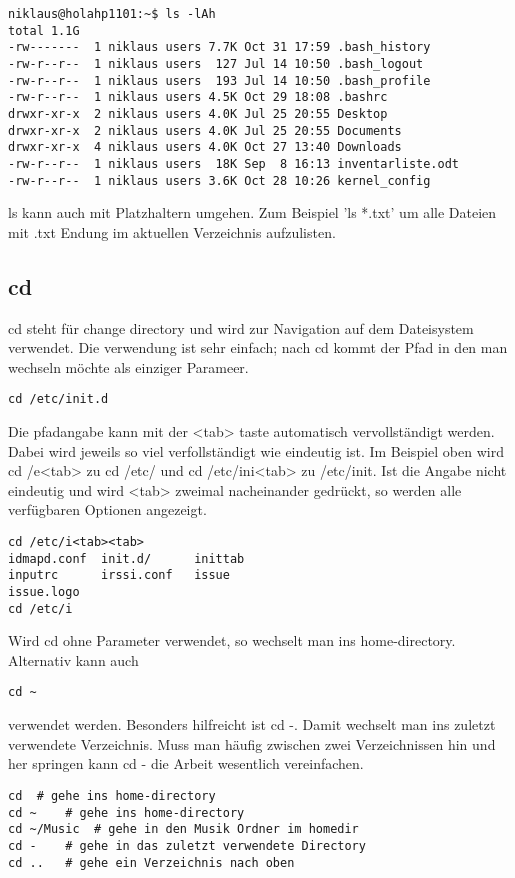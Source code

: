 \begin{lstlisting}[frame=single]
niklaus@holahp1101:~$ ls -lAh
total 1.1G
-rw-------  1 niklaus users 7.7K Oct 31 17:59 .bash_history
-rw-r--r--  1 niklaus users  127 Jul 14 10:50 .bash_logout
-rw-r--r--  1 niklaus users  193 Jul 14 10:50 .bash_profile
-rw-r--r--  1 niklaus users 4.5K Oct 29 18:08 .bashrc
drwxr-xr-x  2 niklaus users 4.0K Jul 25 20:55 Desktop
drwxr-xr-x  2 niklaus users 4.0K Jul 25 20:55 Documents
drwxr-xr-x  4 niklaus users 4.0K Oct 27 13:40 Downloads
-rw-r--r--  1 niklaus users  18K Sep  8 16:13 inventarliste.odt
-rw-r--r--  1 niklaus users 3.6K Oct 28 10:26 kernel_config
\end{lstlisting}
ls kann auch mit Platzhaltern umgehen. Zum Beispiel 'ls *.txt' um alle Dateien mit .txt Endung im aktuellen Verzeichnis aufzulisten.
\subsection{cd}
cd steht f\"ur change directory und wird zur Navigation auf dem Dateisystem verwendet. Die verwendung ist sehr einfach; nach cd kommt der Pfad in den man wechseln m\"ochte als einziger Parameer.
\begin{lstlisting}[frame=single]
cd /etc/init.d
\end{lstlisting}
Die pfadangabe kann mit der <tab> taste automatisch vervollst\"andigt werden. Dabei wird jeweils so viel verfollst\"andigt wie eindeutig ist. Im Beispiel oben wird cd /e<tab> zu cd /etc/ und cd /etc/ini<tab> zu /etc/init. Ist die Angabe nicht eindeutig und wird <tab> zweimal nacheinander gedr\"uckt, so werden alle verf\"ugbaren Optionen angezeigt.
\begin{lstlisting}[frame=single]
cd /etc/i<tab><tab>
idmapd.conf  init.d/      inittab
inputrc      irssi.conf   issue
issue.logo
cd /etc/i
\end{lstlisting}
Wird cd ohne Parameter verwendet, so wechselt man ins home-directory. Alternativ kann auch
\begin{lstlisting}[frame=single]
cd ~
\end{lstlisting}
verwendet werden. Besonders hilfreicht ist cd -. Damit wechselt man ins zuletzt verwendete Verzeichnis. Muss man h\"aufig zwischen zwei Verzeichnissen hin und her springen kann cd - die Arbeit wesentlich vereinfachen.
\begin{lstlisting}[frame=single]
cd	# gehe ins home-directory
cd ~	# gehe ins home-directory
cd ~/Music	# gehe in den Musik Ordner im homedir
cd -	# gehe in das zuletzt verwendete Directory
cd ..	# gehe ein Verzeichnis nach oben
\end{lstlisting}
